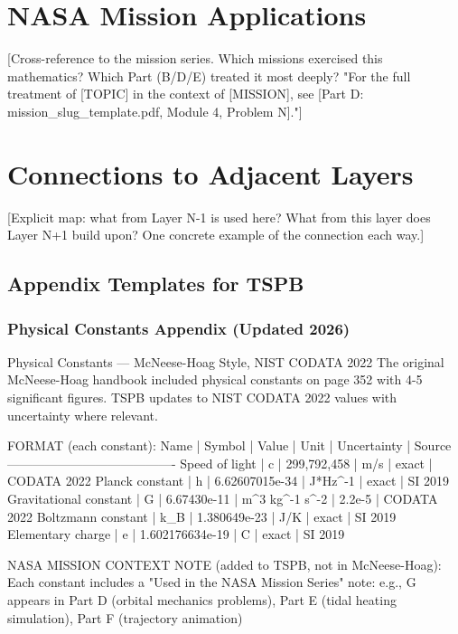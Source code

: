 \documentclass[11pt,letterpaper]{article}
\begin{document}
\begin{asciibox}
\section{NASA Mission Applications}
  [Cross-reference to the mission series. Which missions exercised
   this mathematics? Which Part (B/D/E) treated it most deeply?
   "For the full treatment of [TOPIC] in the context of [MISSION],
    see [Part D: mission\_slug\_template.pdf, Module 4, Problem N]."]

\section{Connections to Adjacent Layers}
  [Explicit map: what from Layer N-1 is used here?
   What from this layer does Layer N+1 build upon?
   One concrete example of the connection each way.]
\end{asciibox}

\subsection{Appendix Templates for TSPB}

\subsubsection{Physical Constants Appendix (Updated 2026)}

\begin{tspbbox}{Physical Constants --- McNeese-Hoag Style, NIST CODATA 2022}
The original McNeese-Hoag handbook included physical constants on page 352
with 4-5 significant figures. TSPB updates to NIST CODATA 2022 values with
uncertainty where relevant.

FORMAT (each constant):
  Name | Symbol | Value | Unit | Uncertainty | Source
  ----------------------------------------
  Speed of light | c | 299,792,458 | m/s | exact | CODATA 2022
  Planck constant | h | 6.62607015e-34 | J*Hz\^{}-1 | exact | SI 2019
  Gravitational constant | G | 6.67430e-11 | m\^{}3 kg\^{}-1 s\^{}-2 | 2.2e-5 | CODATA 2022
  Boltzmann constant | k\_B | 1.380649e-23 | J/K | exact | SI 2019
  Elementary charge | e | 1.602176634e-19 | C | exact | SI 2019

NASA MISSION CONTEXT NOTE (added to TSPB, not in McNeese-Hoag):
  Each constant includes a "Used in the NASA Mission Series" note:
  e.g., G appears in Part D (orbital mechanics problems),
  Part E (tidal heating simulation), Part F (trajectory animation)
\end{tspbbox}
\end{document}
